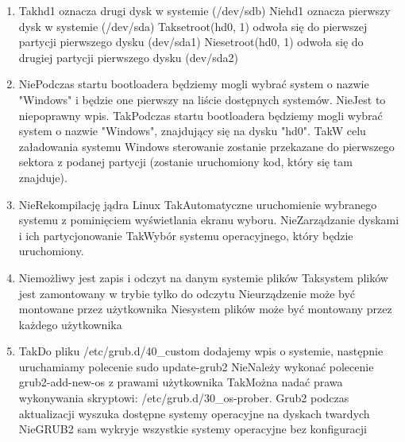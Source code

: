 \begin{enumerate}
	\item {}
	{Tak}{hd1 oznacza drugi dysk w systemie (/dev/sdb)}
	{Nie}{hd1 oznacza pierwszy dysk w systemie (/dev/sda)}
	{Tak}{setroot(hd0, 1) odwoła się do pierwszej partycji pierwszego dysku (dev/sda1)}
	{Nie}{setroot(hd0, 1) odwoła się do drugiej partycji pierwszego dysku (dev/sda2)}
	
	\item {}
	{Nie}{Podczas startu bootloadera będziemy mogli wybrać system o nazwie "Windows" i będzie one pierwszy na liście dostępnych systemów.}
	{Nie}{Jest to niepoprawny wpis.}
	{Tak}{Podczas startu bootloadera będziemy mogli wybrać system o nazwie "Windows", znajdujący się na dysku "hd0".}
	{Tak}{W celu załadowania systemu Windows sterowanie zostanie przekazane do pierwszego sektora z podanej partycji (zostanie uruchomiony kod, który się tam znajduje).}

	\item {}
	{Nie}{Rekompilację jądra Linux}
	{Tak}{Automatyczne uruchomienie wybranego systemu z pominięciem wyświetlania ekranu wyboru.}
	{Nie}{Zarządzanie dyskami i ich partycjonowanie}
	{Tak}{Wybór systemu operacyjnego, który będzie uruchomiony.}

	\item {}
	{Nie}{możliwy jest zapis i odczyt na danym systemie plików}
	{Tak}{system plików jest zamontowany w trybie tylko do odczytu}
	{Nie}{urządzenie może być montowane przez użytkownika}
	{Nie}{system plików może być montowany przez każdego użytkownika}
	
	\item {}
	{Tak}{Do pliku /etc/grub.d/40\_custom dodajemy wpis o systemie, następnie uruchamiamy polecenie sudo update-grub2}
	{Nie}{Należy wykonać polecenie grub2-add-new-os z prawami użytkownika}
	{Tak}{Można nadać prawa wykonywania skryptowi: /etc/grub.d/30\_os-prober. Grub2 podczas aktualizacji wyszuka dostępne systemy operacyjne na dyskach twardych}
	{Nie}{GRUB2 sam wykryje wszystkie systemy operacyjne bez konfiguracji}
	

\end{enumerate}
